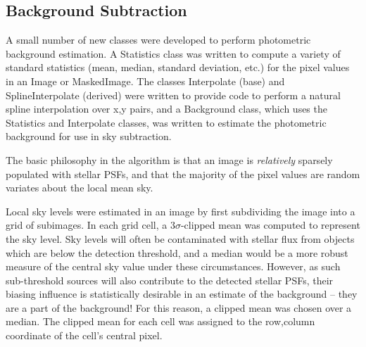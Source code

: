 
\subsection{Background Subtraction}


A small number of new classes were developed to perform photometric
background estimation.  A Statistics class was written to compute a
variety of standard statistics (mean, median, standard deviation,
etc.) for the pixel values in an Image or MaskedImage.  The classes
Interpolate (base) and SplineInterpolate (derived) were written to
provide code to perform a natural spline interpolation over x,y pairs,
and a Background class, which uses the Statistics and Interpolate
classes, was written to estimate the photometric background for use in
sky subtraction.


The basic philosophy in the algorithm is that an image is {\itshape
relatively} sparsely populated with stellar PSFs, and that the
majority of the pixel values are random variates about the local mean
sky.


Local sky levels were estimated in an image by first subdividing the
image into a grid of subimages.  In each grid cell, a
3$\sigma$-clipped mean was computed to represent the sky level.  Sky
levels will often be contaminated with stellar flux from objects which
are below the detection threshold, and a median would be a more robust
measure of the central sky value under these circumstances.  However,
as such sub-threshold sources will also contribute to the detected
stellar PSFs, their biasing influence is statistically desirable in an
estimate of the background -- they are a part of the background!  For
this reason, a clipped mean was chosen over a median.  The clipped
mean for each cell was assigned to the row,column coordinate of the
cell's central pixel.


